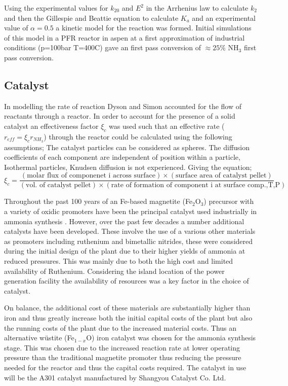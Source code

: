 {Using the experimental values for $k_20$ and $E^2$ in the Arrhenius law to calculate $k_2$ and then the Gillespie and Beattie equation to calculate $K_a$ and an experimental value of $\alpha = 0.5$ a kinetic model for the reaction was formed. Initial simulations of this model in a PFR reactor in aspen at a first approximation of industrial conditions (p=100bar T=400\textdegree C) gave an first pass conversion of $\approx25\% $ NH$_3$ first pass conversion.

\subsection{Catalyst}

In modelling the rate of reaction Dyson and Simon accounted for the flow of reactants through a reactor. In order to account for the presence of a solid catalyst an effectiveness factor $\xi_{c}$ was used such that an effective rate ($r_{eff}=\xi_{c}r_{NH_3}$) through the reactor could be calculated using the following assumptions\cite{Dyson1968}; The catalyst particles can be considered as spheres. The diffusion coefficients of each component are independent of position within a particle, Isothermal particles, Knudsen diffusion is not experienced. Giving the equation;
\begin{equation}
	\xi_{c} = \frac{(\text{molar flux of componenet i across surface})\times(\text{surface area of catalyst pellet})}{(\text{vol. of catalyst pellet})\times(\text{rate of formation of component i at surface comp.,T,P})}
\end{equation}

Throughout the past 100 years of an Fe-based magnetite (Fe$_{2}$O$_3$) precursor with a variety of oxidic promoters have been the principal catalyst used industrially in ammonia synthesis \cite{Liu2014}. However, over the past few decades a number additional catalysts have been developed. These involve the use of a various other materials as promoters including ruthenium and bimetallic nitrides, these were considered during the initial design of the plant due to their higher yields of ammonia at reduced pressures. This was mainly due to both the high cost and limited availability of Ruthenium. Considering the island location of the power generation facility the availability of resources was a key factor in the choice of catalyst.

On balance, the additional cost of these materials are substantially higher than iron and thus greatly increase both the initial capital costs of the plant but also the running costs of the plant due to the increased material costs. Thus an alternative w\"{u}stite (Fe$_{1-x}$O) iron catalyst was chosen for the ammonia synthesis stage. This was chosen due to the increased reaction rate at lower operating pressure than the traditional magnetite promoter thus reducing the pressure needed for the reactor and thus the capital costs required. The catalyst in use will be the A301 catalyst manufactured by Shangyou Catalyst Co. Ltd. 



}
